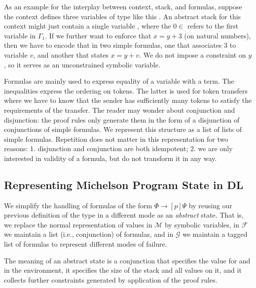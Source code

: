 As an example for the interplay between context, stack, and formulas,
suppose the context defines three variables of type 
 like this {\ExamplesContext}. An abstract stack for this
context might just contain a single variable {\ExamplesXZero}, where
the $0\in$ refers to the first variable in $\Gamma_1$.
\ExamplesAStack
If we further
want to enforce that $x = y + 3$ (on natural numbers), then we have to
encode that in two simple formulas, one that associates $3$ to
variable $v$, and another that states $x = y + v$. We do not impose a
constraint on $y$, so it serves as an unconstrained symbolic variable.
\ExamplesEqnPlus

Formulas are mainly used to express equality of a variable with a
term. The inequalities express the ordering on tokens. The latter is used for token transfers
where we have to know that the sender has sufficiently many tokens to satisfy
the requirements of the transfer. The reader may wonder about 
conjunction and disjunction: the proof rules only generate them in the
form of a disjunction of conjunctions of simple formulas.  We
represent this structure as a list of lists of simple
formulas. Repetition does not matter in this
representation for two reasons: 1. disjunction and conjunction are
both idempotent; 2. we are only interested in validity of a formula,
but do not transform it in any way.


\subsection{Representing Michelson Program State in DL}
\label{sec:abstract-states}

We simplify the handling of formulas of the form $\Phi \to [p]\Psi$ by
reusing our previous definition of the type  in a
different mode as an \emph{abstract} state.
\AbstractAMode
That is, we replace the normal representation of values in $\mathcal M$ by symbolic
variables, in $\mathcal{F}$ we maintain a list (i.e., conjunction) of
formulas, and in $\mathcal{G}$ we maintain a tagged list of formulas
to represent different modes of failure. 

The meaning of an abstract state is a conjunction that specifies the
value for  and  in the environment, it
specifies the size of the stack and all values on it, and it collects
further constraints generated by application of the proof rules.



